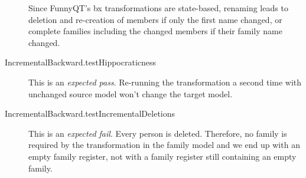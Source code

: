 \documentclass[a4paper]{article}
\begin{document}
\begin{description}
  Since FunnyQT's bx transformations are state-based, renaming leads to
  deletion and re-creation of members if only the first name changed, or
  complete families including the changed members if their family name changed.
\item[IncrementalBackward.testHippocraticness] This is an \emph{expected pass}.
  Re-running the transformation a second time with unchanged source model won't
  change the target model.
\item[IncrementalBackward.testIncrementalDeletions] This is an \emph{expected
    fail}.  Every person is deleted.  Therefore, no family is required by the
  transformation in the family model and we end up with an empty family
  register, not with a family register still containing an empty family.
\end{description}




\end{document}
